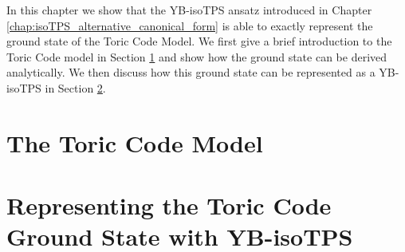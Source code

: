 In this chapter we show that the YB-isoTPS ansatz introduced in Chapter \ref{chap:isoTPS_alternative_canonical_form} is able to exactly represent the ground state of the Toric Code Model. We first give a brief introduction to the Toric Code model in Section \ref{sec:the_toric_code_model} and show how the ground state can be derived analytically. We then discuss how this ground state can be represented as a YB-isoTPS in Section \ref{sec:representing_the_toric_code_gs_with_YB_isoTPS}.

\section{The Toric Code Model}
\label{sec:the_toric_code_model}


\section{Representing the Toric Code Ground State with YB-isoTPS}
\label{sec:representing_the_toric_code_gs_with_YB_isoTPS}
